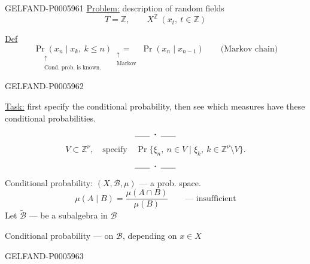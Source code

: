 \begin{GelfandAdjacentEvidence}{GELFAND-P000596}{1}
\underline{Problem:} description of random fields
\[
T=\mathbb Z,\qquad X^{\mathbb Z}\ (x_t,\ t\in\mathbb Z)
\]

\underline{\underline{Def}}
\[
\underset{\substack{\uparrow\\\text{Cond. prob. is known.}}}{\Pr(x_n\mid x_k,\ k\le n)}
\underset{\substack{\uparrow\\\text{Markov}}}{=}
\Pr(x_n\mid x_{n-1})\qquad\text{(Markov chain)}
\]
\end{GelfandAdjacentEvidence}
\begin{GelfandAdjacentEvidence}{GELFAND-P000596}{2}


\underline{Task:} first specify the conditional probability, then see which measures have these conditional probabilities.
\[\rule{1.8em}{.4pt}\;\boldsymbol{\cdot}\;\rule{1.8em}{.4pt}\]
\[
V\subset\mathbb Z^\nu,\quad\text{specify}\quad
\Pr\{\xi_n,\ n\in V\mid\xi_k,\ k\in\mathbb Z^\nu\setminus V\}.
\]
\[\rule{1.8em}{.4pt}\;\boldsymbol{\cdot}\;\rule{1.8em}{.4pt}\]
Conditional probability: \((X,\mathcal B,\mu)\) — a prob. space.
\[
\mu(A\mid B)=\frac{\mu(A\cap B)}{\mu(B)}
\qquad\text{— insufficient}
\]
Let \(\widetilde{\mathcal B}\) — be a subalgebra in \(\mathcal B\)

Conditional probability —
on \(\mathcal B\), depending on \(x\in X\)
\end{GelfandAdjacentEvidence}
\begin{GelfandAdjacentEvidence}{GELFAND-P000596}{3}

\end{GelfandAdjacentEvidence}
